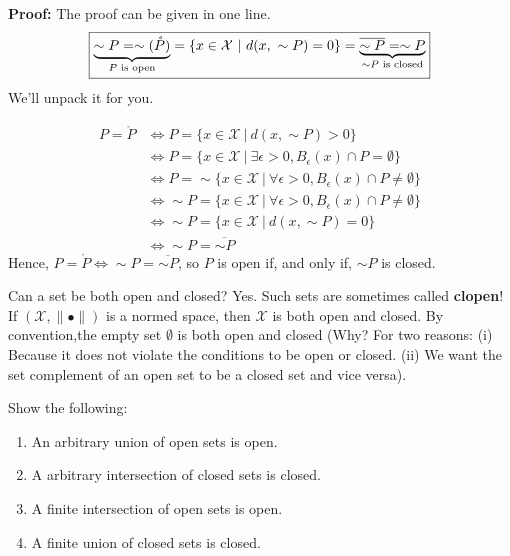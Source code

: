\textbf{Proof:} The proof can be given in one line.
$$\boxed{
    \underbrace{\sim P=\sim(\mathring{P})}_{P\textnormal{ is open}}=\{x\in\mathcal{X}\ |\ d(x,\ \sim P)=0\}=\underbrace{\overline{\sim P}=\sim P}_{\sim P\textnormal{ is closed}}
    }
$$
We'll unpack it for you. 

\begin{align*}
    P = \mathring{P} & \iff P = \{ x \in \mathcal{X}~|~ d(x, \sim P) > 0 \}\\
                        & \iff P = \{ x \in \mathcal{X}~|~\exists \epsilon >0, B_\epsilon(x) \cap P = \emptyset\}\\
                      &  \iff P = \sim \{ x \in \mathcal{X}~|~\forall \epsilon >0, B_\epsilon(x) \cap P \neq \emptyset\}\\
                       &  \iff \sim P = \{ x \in \mathcal{X}~|~\forall \epsilon >0, B_\epsilon(x) \cap P \neq \emptyset\}\\
                       &  \iff \sim P = \{ x \in \mathcal{X}~|~d(x, \sim P) = 0\}\\
                       &  \iff \sim P = \overline{\sim P}
\end{align*}
Hence, $P = \mathring{P} \iff \sim P = \overline{\sim P}$, so $P$ is open if, and only if, $\sim P$ is closed. 
\Qed
 \begin{rem} Can a set be both open and closed? Yes. Such sets are sometimes called \textbf{clopen}! If $(\mathcal{X}, \| \bullet \|)$ is a normed space, then $\mathcal{X}$ is both open and closed. By convention,the empty set $\emptyset$ is both open and closed (Why? For two reasons: (i) Because it does not violate the conditions to be open or closed. (ii) We want the set complement of an open set to be a closed set and vice versa). 
 \end{rem}
 
 \begin{exercise} Show the following:
 \begin{enumerate}
    \renewcommand{\labelenumi}{(\alph{enumi})}
        \setlength{\itemsep}{.1cm}
     \item An arbitrary union of open sets is open.
     \item A arbitrary intersection of closed sets is closed.
     \item A finite intersection of open sets is open.
     \item A finite union of closed sets is closed.
 \end{enumerate}
 \end{exercise}
 
